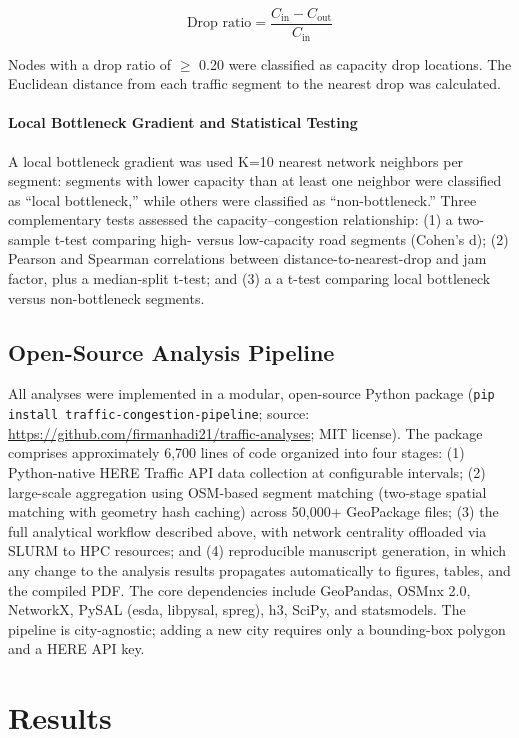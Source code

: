 \documentclass[review,authoryear]{elsarticle}
\begin{document}
\[\text{Drop ratio} = \frac{C_{\text{in}} - C_{\text{out}}}{C_{\text{in}}}\]

Nodes with a drop ratio of  $\geq$ 0.20 were classified as capacity drop locations. The Euclidean distance from each traffic segment to the nearest drop was calculated.

\paragraph{Local Bottleneck Gradient and Statistical Testing}

A local bottleneck gradient was used K=10 nearest network neighbors per segment: segments with lower capacity than at least one neighbor were classified as ``local bottleneck,'' while others were classified as ``non-bottleneck.'' Three complementary tests assessed the capacity--congestion relationship: (1) a two-sample t-test comparing high- versus low-capacity road segments (Cohen's d); (2) Pearson and Spearman correlations between distance-to-nearest-drop and jam factor, plus a median-split t-test; and (3) a a t-test comparing local bottleneck versus non-bottleneck segments.

\subsection{Open-Source Analysis Pipeline}
\label{sec:pipeline}

All analyses were implemented in a modular, open-source Python package (\texttt{pip install traffic-congestion-pipeline}; source: \url{https://github.com/firmanhadi21/traffic-analyses}; MIT license). The package comprises approximately 6,700 lines of code organized into four stages: (1) Python-native HERE Traffic API data collection at configurable intervals; (2) large-scale aggregation using OSM-based segment matching (two-stage spatial matching with geometry hash caching) across 50,000+ GeoPackage files; (3) the full analytical workflow described above, with network centrality offloaded via SLURM to HPC resources; and (4) reproducible manuscript generation, in which any change to the analysis results propagates automatically to figures, tables, and the compiled PDF. The core dependencies include GeoPandas, OSMnx 2.0, NetworkX, PySAL (esda, libpysal, spreg), h3, SciPy, and statsmodels. The pipeline is city-agnostic; adding a new city requires only a bounding-box polygon and a HERE API key.



\section{Results}
\end{document}
